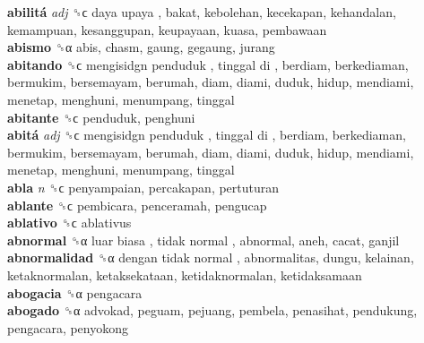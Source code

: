 \textbf{abilitá} \emph{adj}  ␝ϲ   daya upaya , bakat, kebolehan, kecekapan, kehandalan, kemampuan, kesanggupan, keupayaan, kuasa, pembawaan  \\
\textbf{abismo} ␝α  abis, chasm, gaung, gegaung, jurang  \\
\textbf{abitando} ␝ϲ   mengisidgn penduduk ,  tinggal di , berdiam, berkediaman, bermukim, bersemayam, berumah, diam, diami, duduk, hidup, mendiami, menetap, menghuni, menumpang, tinggal  \\
\textbf{abitante} ␝ϲ  penduduk, penghuni  \\
\textbf{abitá} \emph{adj}  ␝ϲ   mengisidgn penduduk ,  tinggal di , berdiam, berkediaman, bermukim, bersemayam, berumah, diam, diami, duduk, hidup, mendiami, menetap, menghuni, menumpang, tinggal  \\
\textbf{abla} \emph{n}  ␝ϲ  penyampaian, percakapan, pertuturan  \\
\textbf{ablante} ␝ϲ  pembicara, penceramah, pengucap  \\
\textbf{ablativo} ␝ϲ  ablativus  \\
\textbf{abnormal} ␝α   luar biasa ,  tidak normal , abnormal, aneh, cacat, ganjil  \\
\textbf{abnormalidad} ␝α   dengan tidak normal , abnormalitas, dungu, kelainan, ketaknormalan, ketaksekataan, ketidaknormalan, ketidaksamaan  \\
\textbf{abogacia} ␝α  pengacara  \\
\textbf{abogado} ␝α  advokad, peguam, pejuang, pembela, penasihat, pendukung, pengacara, penyokong  \\
